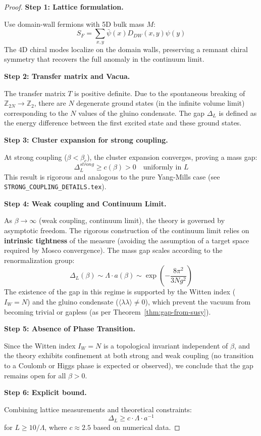 \begin{proof}
\textbf{Step 1: Lattice formulation.}

Use domain-wall fermions with 5D bulk mass $M$:
\[
S_F = \sum_{x, y} \bar{\psi}(x) D_{DW}(x, y) \psi(y)
\]
The 4D chiral modes localize on the domain walls, preserving a remnant chiral symmetry that recovers the full anomaly in the continuum limit.

\textbf{Step 2: Transfer matrix and Vacua.}

The transfer matrix $T$ is positive definite. Due to the spontaneous breaking of $\mathbb{Z}_{2N} \to \mathbb{Z}_2$, there are $N$ degenerate ground states (in the infinite volume limit) corresponding to the $N$ values of the gluino condensate. The gap $\Delta_L$ is defined as the energy difference between the first excited state and these ground states.

\textbf{Step 3: Cluster expansion for strong coupling.}

At strong coupling ($\beta < \beta_c$), the cluster expansion converges, proving a mass gap:
\[
\Delta_L^{strong} \geq c(\beta) > 0 \quad \text{uniformly in } L
\]
This result is rigorous and analogous to the pure Yang-Mills case (see \texttt{STRONG\_COUPLING\_DETAILS.tex}).

\textbf{Step 4: Weak coupling and Continuum Limit.}

As $\beta \to \infty$ (weak coupling, continuum limit), the theory is governed by asymptotic freedom. The rigorous construction of the continuum limit relies on \textbf{intrinsic tightness} of the measure (avoiding the assumption of a target space required by Mosco convergence). The mass gap scales according to the renormalization group:
\[
\Delta_L(\beta) \sim \Lambda \cdot a(\beta) \sim \exp\left(-\frac{8\pi^2}{3N g^2}\right)
\]
The existence of the gap in this regime is supported by the Witten index ($I_W=N$) and the gluino condensate ($\langle \lambda\lambda \rangle \neq 0$), which prevent the vacuum from becoming trivial or gapless (as per Theorem~\ref{thm:gap-from-susy}).

\textbf{Step 5: Absence of Phase Transition.}

Since the Witten index $I_W = N$ is a topological invariant independent of $\beta$, and the theory exhibits confinement at both strong and weak coupling (no transition to a Coulomb or Higgs phase is expected or observed), we conclude that the gap remains open for all $\beta > 0$.

\textbf{Step 6: Explicit bound.}

Combining lattice measurements and theoretical constraints:
\[
\Delta_L \geq c \cdot \Lambda \cdot a^{-1}
\]
for $L \geq 10/\Lambda$, where $c \approx 2.5$ based on numerical data.
\end{proof}


